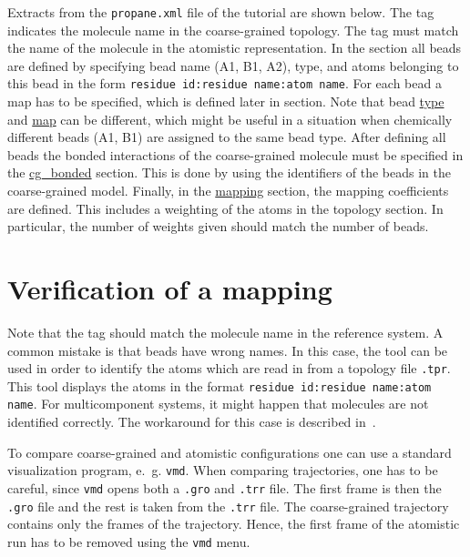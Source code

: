 Extracts from the \texttt{propane.xml} file of the tutorial are shown below. The  tag indicates the molecule name in the coarse-grained topology. The  tag must match the name of the molecule in the atomistic representation. In the  section all beads are defined by specifying bead name (A1, B1, A2), type, and atoms belonging to this bead in the form \texttt{residue id:residue name:atom name}. For each bead a map has to be specified, which is defined later in  section. Note that bead \hyperlink{\mapref{topology.cg_beads.cg_bead.type}}{type} and \hyperlink{\mapref{maps.map}}{map} can be different, which might be useful in a situation when chemically different beads (A1, B1) are assigned to the same bead type. After defining all beads the bonded interactions of the coarse-grained molecule must be specified in the \hyperlink{\mapref{topology.cg_bonded}}{cg\_bonded} section. This is done by using the identifiers of the beads in the coarse-grained model. Finally, in the \hyperlink{\mapref{topology.cg_beads.cg_bead.mapping}}{mapping} section, the mapping coefficients are defined. This includes a weighting of the atoms in the topology section. In particular, the number of weights given should match the number of beads.

\section{Verification of a mapping}
\label{sec:mapping_verification}
Note that the  tag should match the molecule name in the reference system. A common mistake is that beads have wrong names. In this case, the  tool can be used in order to identify the atoms which are read in from a topology file \texttt{.tpr}. This tool displays the atoms in the format \texttt{residue id:residue name:atom name}. For multicomponent systems, it might happen that molecules are not identified correctly. The workaround for this case is described in~.

To compare coarse-grained and atomistic configurations one can use a standard visualization program, e.~g. \texttt{vmd}.  When comparing trajectories, one has to be careful, since \texttt{vmd} opens both a \texttt{.gro} and \texttt{.trr} file. The first frame is then the \texttt{.gro} file and the rest is taken from the \texttt{.trr} file. The coarse-grained trajectory contains only the frames of the  trajectory. Hence, the first frame of the atomistic run has to be removed using the \texttt{vmd} menu.


